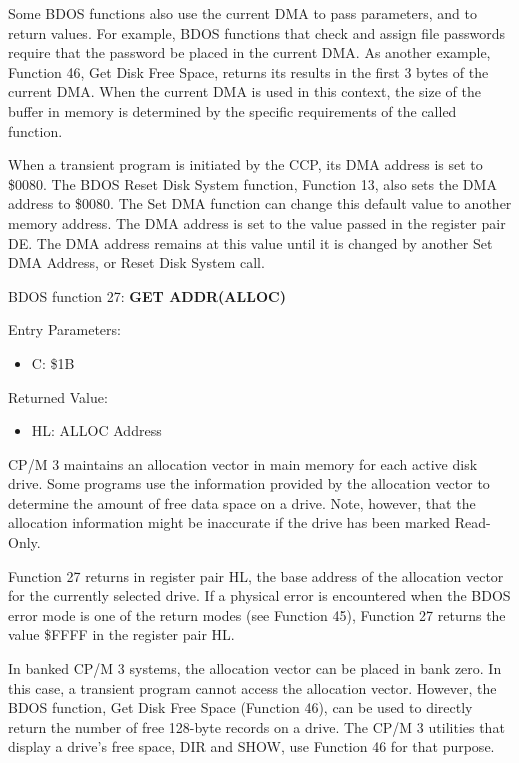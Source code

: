 Some BDOS functions also use the current DMA to pass parameters, and
to return values. For example, BDOS functions that check and assign
file passwords require that the password be placed in the current
DMA. As another example, Function 46, Get Disk Free Space, returns its
results in the first 3 bytes of the current DMA. When the current DMA
is used in this context, the size of the buffer in memory is
determined by the specific requirements of the called function.

When a transient program is initiated by the CCP, its DMA address is
set to \$0080. The BDOS Reset Disk System function, Function 13, also
sets the DMA address to \$0080. The Set DMA function can change this
default value to another memory address. The DMA address is set to the
value passed in the register pair DE.  The DMA address remains at this
value until it is changed by another Set DMA Address, or Reset Disk
System call.

BDOS function 27: \textbf{GET ADDR(ALLOC)}

Entry Parameters:
\begin{itemize}
\item[] C: \$1B
\end{itemize}

Returned Value:
\begin{itemize}
\item[] HL: ALLOC Address
\end{itemize}

CP/M 3 maintains an allocation vector in main memory for each active
disk drive.  Some programs use the information provided by the
allocation vector to determine the amount of free data space on a
drive. Note, however, that the allocation information might be
inaccurate if the drive has been marked Read-Only.

Function 27 returns in register pair HL, the base address of the
allocation vector for the currently selected drive. If a physical
error is encountered when the BDOS error mode is one of the return
modes (see Function 45), Function 27 returns the value \$FFFF in the
register pair HL.

In banked CP/M 3 systems, the allocation vector can be placed in bank
zero. In this case, a transient program cannot access the allocation
vector. However, the BDOS function, Get Disk Free Space (Function 46),
can be used to directly return the number of free 128-byte records on
a drive. The CP/M 3 utilities that display a drive's free space, DIR
and SHOW, use Function 46 for that purpose.

